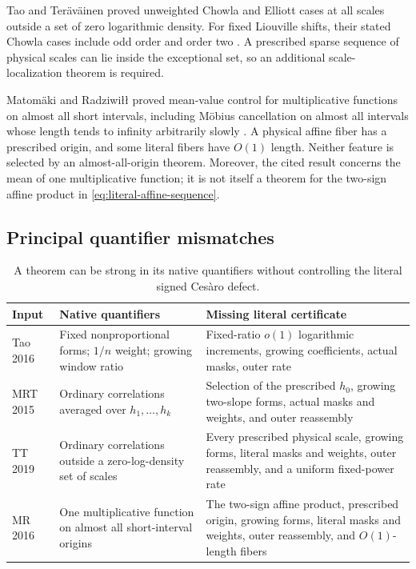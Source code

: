 Tao and Ter\"av\"ainen proved unweighted Chowla and Elliott cases at
all scales outside a set of zero logarithmic density.  For fixed
Liouville shifts, their stated Chowla cases include odd order and
order two \citep{TaoTeravainen2019}.  A prescribed sparse sequence
of physical scales can lie inside the exceptional set, so an
additional scale-localization theorem is required.

Matom\"aki and Radziwi{\l}{\l} proved mean-value control for
multiplicative functions on almost all short intervals, including
M\"obius cancellation on almost all intervals whose length tends to
infinity arbitrarily slowly \citep{MatomakiRadziwill2016}.  A
physical affine fiber has a prescribed origin, and some literal
fibers have \(O(1)\) length.  Neither feature is selected by an
almost-all-origin theorem.  Moreover, the cited result concerns the
mean of one multiplicative function; it is not itself a theorem for
the two-sign affine product in
\eqref{eq:literal-affine-sequence}.

\subsection{Principal quantifier mismatches}

\begin{table}[htbp]
\centering
\small
\renewcommand{\arraystretch}{1.16}
\begin{tabularx}{\textwidth}{
 >{\raggedright\arraybackslash}p{}
 >{\raggedright\arraybackslash}p{}
 >{\raggedright\arraybackslash}X}
\toprule
Input & Native quantifiers & Missing literal certificate\\
\midrule
Tao 2016
& Fixed nonproportional forms; \(1/n\) weight; growing window ratio
& Fixed-ratio \(o(1)\) logarithmic increments, growing coefficients,
actual masks, outer rate\\
\addlinespace
MRT 2015
& Ordinary correlations averaged over \(h_1,\ldots,h_k\)
& Selection of the prescribed \(h_0\), growing two-slope forms,
actual masks and weights, and outer reassembly\\
\addlinespace
TT 2019
& Ordinary correlations outside a zero-log-density set of scales
& Every prescribed physical scale, growing forms, literal masks and
weights, outer reassembly, and a uniform fixed-power rate\\
\addlinespace
MR 2016
& One multiplicative function on almost all short-interval origins
& The two-sign affine product, prescribed origin, growing forms,
literal masks and weights, outer reassembly, and \(O(1)\)-length
fibers\\
\bottomrule
\end{tabularx}
\caption{A theorem can be strong in its native quantifiers without
controlling the literal signed Ces\`aro defect.}
\label{tab:quantifier-mismatch}
\end{table}

